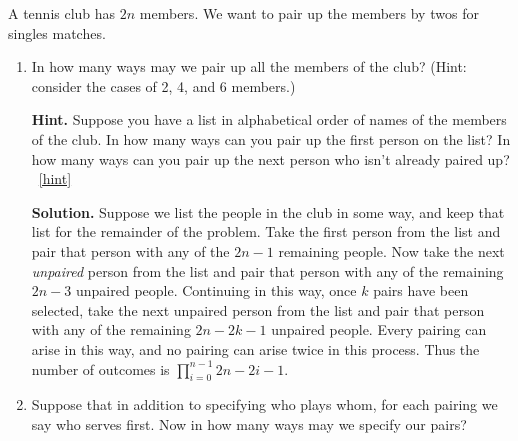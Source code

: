 \documentclass{book}
\begin{document}
\setcounter{project}{86}
\addtocounter{project}{-1}
\begin{activity}[]\label{tennispairings1}
\hypertarget{p-650}{}%
A tennis club has \(2n\) members. We want to pair up the members by twos for singles matches.%
\begin{enumerate}[font=\bfseries,label=(\alph*),ref=\alph*]
\item\label{task-133} \hypertarget{p-651}{}%
In how many ways may we pair up all the members of the club? (Hint: consider the cases of 2, 4, and 6 members.)%
\par\smallskip%
\noindent\textbf{Hint.}\hypertarget{hint-40}{}\quad%
\hypertarget{p-652}{}%
Suppose you have a list in alphabetical order of names of the members of the club. In how many ways can you pair up the first person on the list? In how many ways can you pair up the next person who isn't already paired up?%
~\hfill{\tiny\hyperlink{a-86.a}{[hint]}\hypertarget{q-86.a}{}}\par\smallskip%
\noindent\textbf{Solution.}\hypertarget{solution-44}{}\quad%
\hypertarget{p-653}{}%
Suppose we list the people in the club in some way, and keep that list for the remainder of the problem. Take the first person from the list and pair that person with any of the \(2n-1\) remaining people. Now take the next \emph{unpaired} person from the list and pair that person with any of the remaining \(2n-3\) unpaired people. Continuing in this way, once \(k\) pairs have been selected, take the next unpaired person from the list and pair that person with any of the remaining \(2n-2k-1\) unpaired people. Every pairing can arise in this way, and no pairing can arise twice in this process. Thus the number of outcomes is \(\prod_{i=0}^{n-1} 2n-2i-1\).%
\item\label{task-134} \hypertarget{p-654}{}%
Suppose that in addition to specifying who plays whom, for each pairing we say who serves first.  Now in how many ways may we specify our pairs?%
\end{enumerate}
\end{activity}

\clearpage
\end{document}
